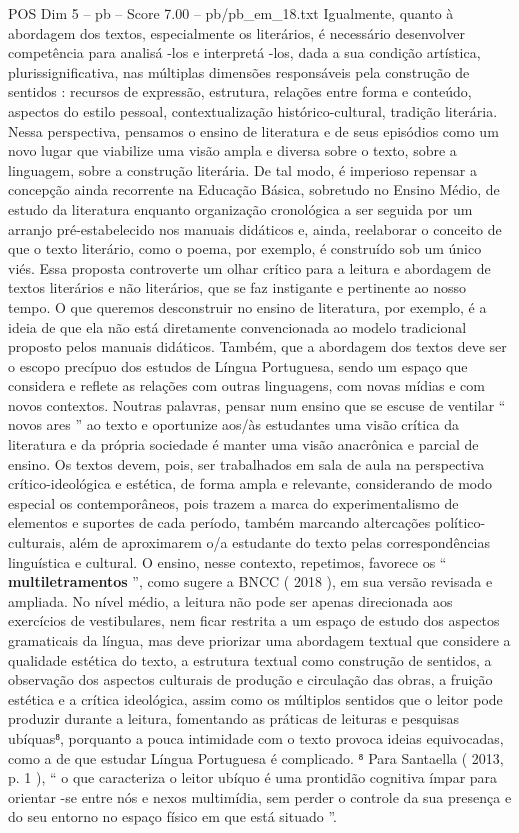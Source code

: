 \begin{textsample}{POS Dim 5 – pb – Score 7.00 – pb/pb\_em\_18.txt}
Igualmente, quanto à abordagem dos textos, especialmente os literários, é necessário desenvolver competência para analisá -los e interpretá -los, dada a sua condição artística, plurissignificativa, nas múltiplas dimensões responsáveis pela construção de sentidos : recursos de expressão, estrutura, relações entre forma e conteúdo, aspectos do estilo pessoal, contextualização histórico-cultural, tradição literária.
Nessa perspectiva, pensamos o ensino de literatura e de seus episódios como um novo lugar que viabilize uma visão ampla e diversa sobre o texto, sobre a linguagem, sobre a construção literária.
De tal modo, é imperioso repensar a concepção ainda recorrente na Educação Básica, sobretudo no Ensino Médio, de estudo da literatura enquanto organização cronológica a ser seguida por um arranjo pré-estabelecido nos manuais didáticos e, ainda, reelaborar o conceito de que o texto literário, como o poema, por exemplo, é construído sob um único viés.
Essa proposta controverte um olhar crítico para a leitura e abordagem de textos literários e não literários, que se faz instigante e pertinente ao nosso tempo.
O que queremos desconstruir no ensino de literatura, por exemplo, é a ideia de que ela não está diretamente convencionada ao modelo tradicional proposto pelos manuais didáticos.
Também, que a abordagem dos textos deve ser o escopo precípuo dos estudos de Língua Portuguesa, sendo um espaço que considera e reflete as relações com outras linguagens, com novas mídias e com novos contextos.
Noutras palavras, pensar num ensino que se escuse de ventilar “ novos ares ” ao texto e oportunize aos/às estudantes uma visão crítica da literatura e da própria sociedade é manter uma visão anacrônica e parcial de ensino.
Os textos devem, pois, ser trabalhados em sala de aula na perspectiva crítico-ideológica e estética, de forma ampla e relevante, considerando de modo especial os contemporâneos, pois trazem a marca do experimentalismo de elementos e suportes de cada período, também marcando altercações político-culturais, além de aproximarem o/a estudante do texto pelas correspondências linguística e cultural.
O ensino, nesse contexto, repetimos, favorece os “ \textbf{multiletramentos} ”, como sugere a BNCC ( 2018 ), em sua versão revisada e ampliada.
No nível médio, a leitura não pode ser apenas direcionada aos exercícios de vestibulares, nem ficar restrita a um espaço de estudo dos aspectos gramaticais da língua, mas deve priorizar uma abordagem textual que considere a qualidade estética do texto, a estrutura textual como construção de sentidos, a observação dos aspectos culturais de produção e circulação das obras, a fruição estética e a crítica ideológica, assim como os múltiplos sentidos que o leitor pode produzir durante a leitura, fomentando as práticas de leituras e pesquisas ubíquas⁸, porquanto a pouca intimidade com o texto provoca ideias equivocadas, como a de que estudar Língua Portuguesa é complicado. ⁸ Para Santaella ( 2013, p. 1 ), “ o que caracteriza o leitor ubíquo é uma prontidão cognitiva ímpar para orientar -se entre nós e nexos multimídia, sem perder o controle da sua presença e do seu entorno no espaço físico em que está situado ”.

\end{textsample}
